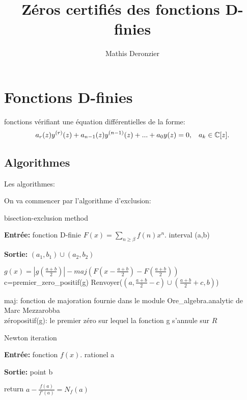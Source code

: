 \documentclass[a4paper,11pt]{article}
\title{Zéros certifiés des fonctions D-finies}
\author{Mathis Deronzier}
\date{}
\begin{document}
	
\maketitle
\newpage
\thispagestyle{empty}

\section{Fonctions D-finies}

fonctions vérifiant une équation différentielles de la forme:\\
\[a_{r}(z)y^{(r)}(z)+a_{n-1}(z)y^{(n-1)}(z)+...+a_{0}y(z)=0, \hspace{3mm} a_{k}\in \mathbb{C}[z].\] 

\subsection{Algorithmes}

Les algorithmes:

On va commencer par l'algorithme d'exclusion:
\begin{algorithm}
	\caption{bisection-exclusion method}
	
	\vspace{2mm}
	
	\textbf{Entrée:} fonction D-finie $F(x)=\sum_{n \geq\beta} f(n)x^{n}$. interval (a,b)
	
	\textbf{Sortie:} $(a_{1},b_{1})\cup (a_{2},b_{2})$
	
	\begin{algorithmic}[1]
		
		\STATE $g(x)=|g(\frac{a+b}{2})|-maj(F(x-\frac{a+b}{2})-F(\frac{a+b}{2}))$
		\STATE c=premier\_zero\_positif(g)
		\STATE Renvoyer($(a,\frac{a+b}{2}-c)\cup (\frac{a+b}{2}+c,b)$)
	\end{algorithmic}

\end{algorithm}

\noindent maj: fonction de majoration fournie dans le module Ore\_algebra.analytic de Marc Mezzarobba\\
zéropositif(g): le premier zéro sur lequel la fonction g s'annule sur ${R}$
\begin{algorithm}
	\caption{Newton iteration}
	
	\vspace{2mm}
	
	\textbf{Entrée:} fonction $f(x)$. rationel a
	
	\textbf{Sortie:} point b
	
	\begin{algorithmic}[1]
		
		\STATE return $a-\frac{f(a)}{f'(a)}=N_{f}(a)$
	\end{algorithmic}
	
\end{algorithm}
\end{document}
